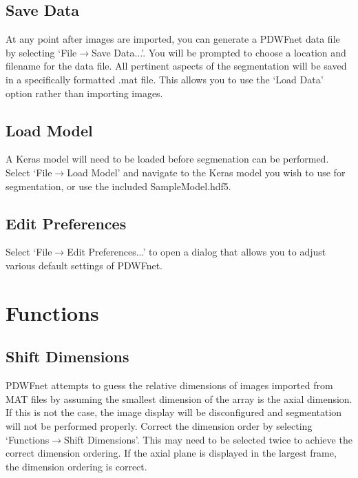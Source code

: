 \documentclass[twoside,a4paper]{refart}
\begin{document}
\subsection{Save Data}

At any point after images are imported, you can generate a PDWFnet data file by selecting `File$\rightarrow$Save Data...'. You will be prompted to choose a location and filename for the data file. All pertinent aspects of the segmentation will be saved in a specifically formatted .mat file. This allows you to use the `Load Data' option rather than importing images.

\subsection{Load Model}

A Keras model will need to be loaded before segmenation can be performed. Select `File$\rightarrow$Load Model' and navigate to the Keras model you wish to use for segmentation, or use the included SampleModel.hdf5.

\subsection{Edit Preferences}

Select `File$\rightarrow$Edit Preferences...' to open a dialog that allows you to adjust various default settings of PDWFnet.



\section{Functions}


\subsection{Shift Dimensions}

PDWFnet attempts to guess the relative dimensions of images imported from MAT files by assuming the smallest dimension of the array is the axial dimension. If this is not the case, the image display will be disconfigured and segmentation will not be performed properly. Correct the dimension order by selecting `Functions$\rightarrow$Shift Dimensions'. This may need to be selected twice to achieve the correct dimension ordering. If the axial plane is displayed in the largest frame, the dimension ordering is correct.
\end{document}
